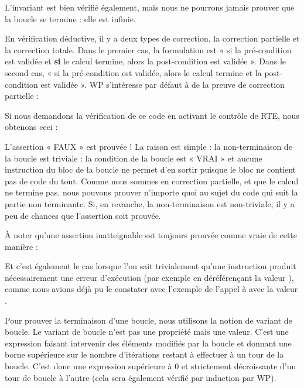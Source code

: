 L'invariant est bien vérifié également, mais nous ne pourrons jamais prouver
que la boucle se termine : elle est infinie.





En vérification déductive, il y a deux types de correction, la correction 
partielle et la correction totale. Dans le premier cas, la formulation est 
« si la pré-condition est validée et \textbf{si} le calcul termine, alors la 
post-condition est validée ». Dans le second cas, « si la pré-condition est 
validée, alors le calcul termine et la post-condition est validée ». WP 
s'intéresse par défaut à de la preuve de correction partielle :





Si nous demandons la vérification de ce code en activant le contrôle de RTE,
nous obtenons ceci :





L'assertion « FAUX » est prouvée ! La raison est simple : la non-terminaison de
la boucle est triviale : la condition de la boucle est « VRAI » et aucune instruction
du bloc de la boucle ne permet d'en sortir puisque le bloc ne contient pas de code du
tout. Comme nous sommes en correction partielle, et que le calcul ne termine pas, nous
pouvons prouver n'importe quoi au sujet du code qui suit la partie non terminante. Si,
en revanche, la non-terminaison est non-triviale, il y a peu de chances que l'assertion
soit prouvée.



\begin{Information}
À noter qu'une assertion inatteignable est toujours prouvée comme vraie de cette 
manière :

Et c'est également le cas lorsque l'on sait trivialement qu'une instruction
produit nécessairement une erreur d'exécution (par exemple en déréférençant 
la valeur ), comme nous avions déjà pu le constater avec l'exemple
de l'appel à  avec la valeur .
\end{Information}


Pour prouver la terminaison d'une boucle, nous utilisons la notion de variant de 
boucle. Le variant de boucle n'est pas une propriété mais une valeur. C'est une 
expression faisant intervenir des éléments modifiés par la boucle et donnant une
borne supérieure sur le nombre d'itérations restant à effectuer à un tour de la
boucle. C'est donc une expression supérieure à 0 et strictement décroissante d'un 
tour de boucle à l'autre (cela sera également vérifié par induction par WP).



